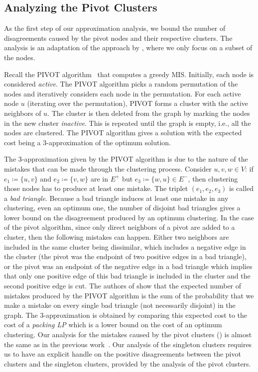 \documentclass{theoretics}
\newcommand{\pivot}{\textrm{PIVOT}\xspace}
\newcommand{\lp}{\textrm{LP}\xspace}
\begin{document}
\subsection{Analyzing the Pivot Clusters}\label{sec: pivot clusters}
As the first step of our approximation analysis, we bound the number of disagreements caused by the pivot nodes and their respective clusters.
The analysis is an adaptation of the approach by \cite{ailon2008aggregating}, where we only focus on a subset of the nodes.

Recall the \pivot algorithm~\cite{ailon2008aggregating} that computes a greedy MIS. 
Initially, each node is considered \emph{active}.
The \pivot algorithm picks a random permutation of the nodes and iteratively considers each node in the permutation. 
For each active node $u$ (iterating over the permutation), \pivot forms a cluster with the active neighbors of $u$. 
The cluster is then deleted from the graph by marking the nodes in the new cluster \emph{inactive}. 
This is repeated until the graph is empty, i.e., all the nodes are clustered. 
The \pivot algorithm gives a solution with the expected cost being a $3$-approximation of the optimum solution.

The $3$-approximation given by the \pivot algorithm is due to the nature of the mistakes that can be made through the clustering process.
Consider $u, v, w \in V$: if $e_1 \coloneqq \{u, v\}$ and $e_2 \coloneqq \{v, w\}$ are in $E^+$ but $e_3 \coloneqq \{w, u\}\in E^-$, then clustering those nodes has to produce at least one mistake. 
The triplet $(e_1, e_2, e_3)$ is called a \textit{bad triangle}. 
Because a bad triangle induces at least one mistake in any clustering, even an optimum one, the number of disjoint bad triangles gives a lower bound on the disagreement produced by an optimum clustering. 
In the case of the pivot algorithm, since only direct neighbors of a pivot are added to a cluster, then the following mistakes can happen. 
Either two neighbors are included in the same cluster being dissimilar, which includes a negative edge in the cluster (the pivot was the endpoint of two positive edges in a bad triangle), or the pivot was an endpoint of the negative edge in a bad triangle which implies that only one positive edge of this bad triangle is included in the cluster and the second positive edge is cut. 
The authors of \cite{ailon2008aggregating} show that the expected number of mistakes produced by the \pivot algorithm is the sum of the probability that we make a mistake on every single bad triangle (not necessarily disjoint) in the graph. 
The $3$-approximation is obtained by comparing this expected cost to the cost of a \emph{packing \lp} which is a lower bound on the cost of an optimum clustering.
Our analysis for the mistakes caused by the pivot clusters () is almost the same as in the previous work~\cite{ailon2008aggregating}. 
Our analysis of the singleton clusters requires us to have an explicit handle on the positive disagreements between the pivot clusters and the singleton clusters, provided by the analysis of the pivot clusters.
\end{document}
